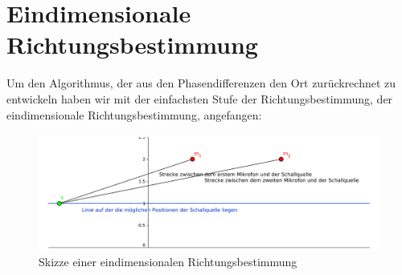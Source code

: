 \section{Eindimensionale Richtungsbestimmung} 
  Um den Algorithmus, der aus den Phasendifferenzen den Ort zurückrechnet zu entwickeln haben wir mit der
einfachsten Stufe der Richtungsbestimmung, der eindimensionale Richtungsbestimmung, angefangen:
\begin{figure}
  \centering
  \includegraphics[width=\linewidth]{img/skizze1d}
  \caption{Skizze einer eindimensionalen Richtungsbestimmung}
\label{fig:skizz1d}
\end{figure}


